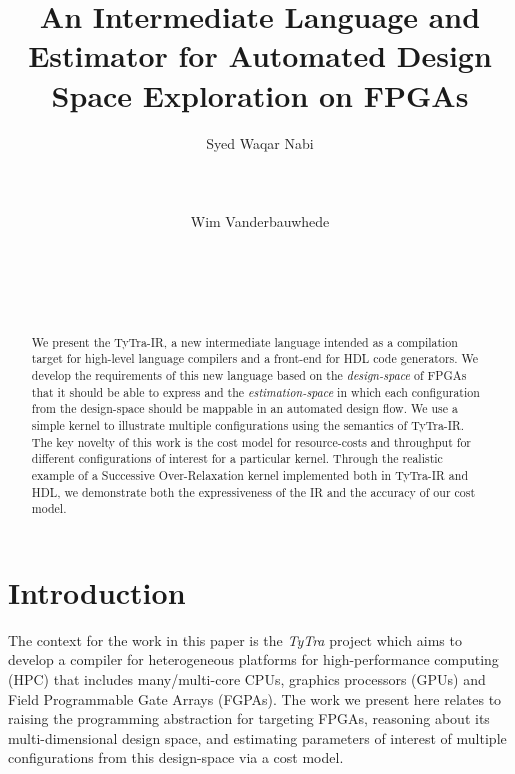 \documentclass[]{heart2015_WN4Pre}
\title{An Intermediate Language and Estimator for Automated Design Space Exploration on FPGAs}
\author{ 
	\alignauthor Syed Waqar Nabi\\
	\affaddr {School of Computing Science,}\\
	\affaddr {University of Glasgow,} \\
	\affaddr {Glasgow G12 8QQ, UK.}\\ 
	\email {syed.nabi@glasgow.ac.uk}
	\alignauthor Wim Vanderbauwhede\\
	\affaddr {School of Computing Science,}\\
	\affaddr {University of Glasgow,} \\
	\affaddr {Glasgow G12 8QQ, UK.}\\ 
	\email {wim.vanderbauwhede@glasgow.ac.uk}\\	
}
\begin{document}

\maketitle

\begin{abstract}
We present the TyTra-IR, a new intermediate language intended as a compilation target for high-level language compilers and a front-end for HDL code generators. 
We develop the requirements of this new language based on the \textit{design-space} of FPGAs that it should be able to express and the \textit{estimation-space} in which each configuration from the design-space should be mappable in an automated design flow. We use a simple kernel to illustrate multiple configurations using the semantics of TyTra-IR. The key novelty of this work is the cost model for resource-costs and throughput for different configurations of interest for a particular kernel. Through the realistic example of a Successive Over-Relaxation kernel  implemented both in TyTra-IR and HDL, we demonstrate both the expressiveness of the IR and  the accuracy of our cost model.
\end{abstract}

\section{Introduction}
\label{sec:intro}

The context for  the work in this paper is the \textit{TyTra} project \cite{tytra_website}which aims to develop  a compiler for heterogeneous platforms for high-performance computing (HPC) that includes many/multi-core CPUs, graphics processors (GPUs) and Field Programmable Gate Arrays (FGPAs). The work we present here relates to raising the programming abstraction for targeting FPGAs, reasoning about its multi-dimensional  design space, and estimating parameters of interest of multiple configurations from this design-space via a cost model. 
\end{document}

